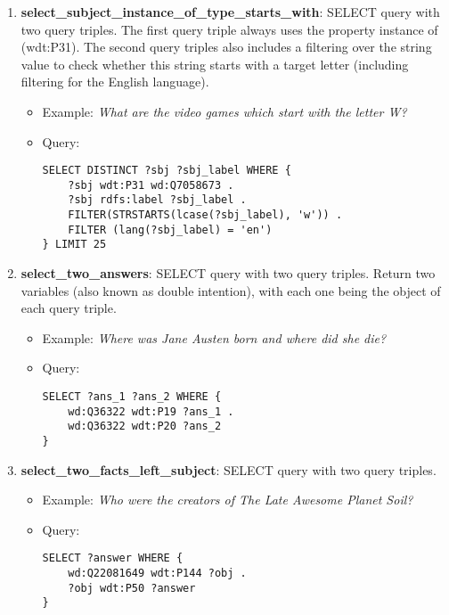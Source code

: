 \begin{enumerate}
    \item \textbf{select\_subject\_instance\_of\_type\_starts\_with}: SELECT query with two query triples. 
    The first query triple always uses the property instance of (wdt:P31). The second query triples 
    also includes a filtering over the string value to check whether this string starts with a target 
    letter (including filtering for the  English language).
    \begin{itemize}
        \item Example: \textit{What are the video games which start with the letter W?}
        \item Query:
        \begin{lstlisting}[basicstyle=\ttfamily,frame=single]        
SELECT DISTINCT ?sbj ?sbj_label WHERE { 
    ?sbj wdt:P31 wd:Q7058673 . 
    ?sbj rdfs:label ?sbj_label . 
    FILTER(STRSTARTS(lcase(?sbj_label), 'w')) . 
    FILTER (lang(?sbj_label) = 'en') 
} LIMIT 25
        \end{lstlisting}
    \end{itemize}
    
    \item \textbf{select\_two\_answers}: SELECT query with two query triples. Return two variables 
    (also known as double intention), with each one being the object of each query triple.
    \begin{itemize}
        \item Example: \textit{Where was Jane Austen born and where did she die?}
        \item Query:
        \begin{lstlisting}[basicstyle=\ttfamily,frame=single]        
SELECT ?ans_1 ?ans_2 WHERE { 
    wd:Q36322 wdt:P19 ?ans_1 . 
    wd:Q36322 wdt:P20 ?ans_2 
}
        \end{lstlisting}
    \end{itemize}
    
    \item \textbf{select\_two\_facts\_left\_subject}: SELECT query with two query triples.
    \begin{itemize}
        \item Example: \textit{Who were the creators of The Late Awesome Planet Soil?}
        \item Query:
        \begin{lstlisting}[basicstyle=\ttfamily,frame=single]        
SELECT ?answer WHERE { 
    wd:Q22081649 wdt:P144 ?obj . 
    ?obj wdt:P50 ?answer
}
        \end{lstlisting}
    \end{itemize}
    

\end{enumerate}
